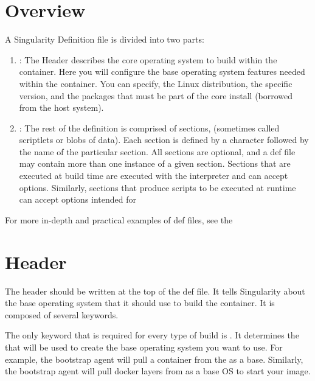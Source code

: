 \documentclass[letterpaper,10pt,english]{sphinxmanual}
\begin{document}
\section{Overview}
\label{\detokenize{definition_files:overview}}
A Singularity Definition file is divided into two parts:
\begin{enumerate}
\item {} 
: The Header describes the core operating system to build within
the container. Here you will configure the base operating system features
needed within the container. You can specify, the Linux distribution, the
specific version, and the packages that must be part of the core install
(borrowed from the host system).

\item {} 
: The rest of the definition is comprised of sections, (sometimes
called scriptlets or blobs of data). Each section is defined by a \sphinxcode{\sphinxupquote{\%}}
character followed by the name of the particular section. All sections are
optional, and a def file may contain more than one instance of a given
section. Sections that are executed at build time are executed with the
 interpreter and can accept  options. Similarly,
sections that produce scripts to be executed at runtime can accept options
intended for 

\end{enumerate}

For more in-depth and practical examples of def files, see the 


\section{Header}
\label{\detokenize{definition_files:header}}
The header should be written at the top of the def file. It tells Singularity
about the base operating system that it should use to build the container. It is
composed of several keywords.

The only keyword that is required for every type of build is .
It determines the   that will be used to create the base
operating system you want to use. For example, the  bootstrap agent
will pull a container from the  as a base. Similarly, the 
bootstrap agent will pull docker layers from  as a base OS to start your image.
\end{document}
